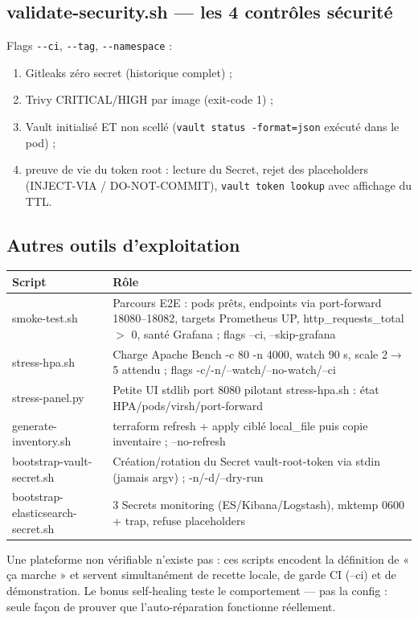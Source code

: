 \documentclass[12pt,a4paper]{article}
\begin{document}
\subsection{validate-security.sh --- les 4 contrôles sécurité}
Flags \texttt{-{}-ci}, \texttt{-{}-tag}, \texttt{-{}-namespace} :
\begin{enumerate}[itemsep=1pt]
  \item Gitleaks zéro secret (historique complet) ;
  \item Trivy CRITICAL/HIGH par image (exit-code 1) ;
  \item Vault initialisé ET non scellé (\texttt{vault status -format=json} exécuté dans le pod) ;
  \item preuve de vie du token root : lecture du Secret, rejet des placeholders (INJECT-VIA / DO-NOT-COMMIT), \texttt{vault token lookup} avec affichage du TTL.
\end{enumerate}

\subsection{Autres outils d'exploitation}
\begin{longtable}{@{}p{4.4cm}p{9.6cm}@{}}
\toprule
\textbf{Script} & \textbf{Rôle} \\
\midrule
\endhead
smoke-test.sh & Parcours E2E : pods prêts, endpoints via port-forward 18080--18082, targets Prometheus UP, http\_requests\_total $>$ 0, santé Grafana ; flags --ci, --skip-grafana \\
stress-hpa.sh & Charge Apache Bench -c 80 -n 4000, watch 90 s, scale 2$\rightarrow$5 attendu ; flags -c/-n/--watch/--no-watch/--ci \\
stress-panel.py & Petite UI stdlib port 8080 pilotant stress-hpa.sh : état HPA/pods/virsh/port-forward \\
generate-inventory.sh & terraform refresh + apply ciblé local\_file puis copie inventaire ; --no-refresh \\
bootstrap-vault-secret.sh & Création/rotation du Secret vault-root-token via stdin (jamais argv) ; -n/-d/--dry-run \\
bootstrap-elasticsearch-secret.sh & 3 Secrets monitoring (ES/Kibana/Logstash), mktemp 0600 + trap, refuse placeholders \\
\bottomrule
\end{longtable}

\begin{whybox}
Une plateforme non vérifiable n'existe pas : ces scripts encodent la définition de « ça marche » et servent simultanément de recette locale, de garde CI (--ci) et de démonstration. Le bonus self-healing teste le comportement --- pas la config : seule façon de prouver que l'auto-réparation fonctionne réellement.
\end{whybox}
\end{document}

